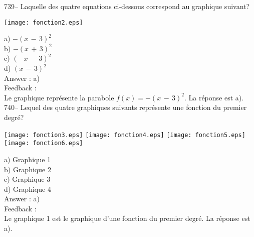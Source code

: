 ﻿\documentclass[letterpaper, 12pt]{article}
\begin{document}
739-- Laquelle des quatre equations ci-dessous correspond au graphique
suivant?\\
    \begin{center}
    \texttt{[image: fonction2.eps]}
    \end{center}

a) $-(x\,-\,3)^{2}$\\
b) $-(x\,+\,3)^{2}$\\
c) $(-x\,-\,3)^{2}$\\
d) $(x\,-\,3)^{2}$\\

Answer : a)\\

Feedback : \\
Le graphique repr\'esente la parabole $f(x)=-(x\,-\,3)^{2}$.  La r\'eponse
est a).  \\

740-- Lequel des quatre graphiques suivants repr\'esente une fonction du
premier degr\'e?\\
    \begin{center}
    \texttt{[image: fonction3.eps]}
\texttt{[image: fonction4.eps]}
\texttt{[image: fonction5.eps]}
\texttt{[image: fonction6.eps]}
    \end{center}
a) Graphique 1\\
b) Graphique 2\\
c) Graphique 3\\
d) Graphique 4\\

Answer : a)\\

Feedback : \\
Le graphique 1 est le graphique d'une fonction du premier degr\'e.  La
r\'eponse est a).\\
\end{document}
